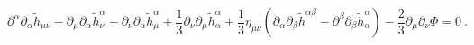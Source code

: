 \begin{equation}
\partial ^{\alpha }\partial _{\alpha }\tilde{h}_{\mu \nu }-\partial _{\mu
}\partial _{\alpha }\tilde{h}_{\nu }^{\alpha }-\partial _{\nu }\partial
_{\alpha }\tilde{h}_{\mu }^{\alpha }+\frac{1}{3}\partial _{\nu }\partial
_{\mu }\tilde{h}_{\alpha }^{\alpha }+\frac{1}{3}\eta _{\mu \nu }\left(
\partial _{\alpha }\partial _{\beta }\tilde{h}^{\alpha \beta }-\partial
^{\beta }\partial _{\beta }\tilde{h}_{\alpha }^{\alpha }\right) -\frac{2}{3}%
\partial _{\mu }\partial _{\nu }\Phi =0\ .  \label{qqq}
\end{equation}%
